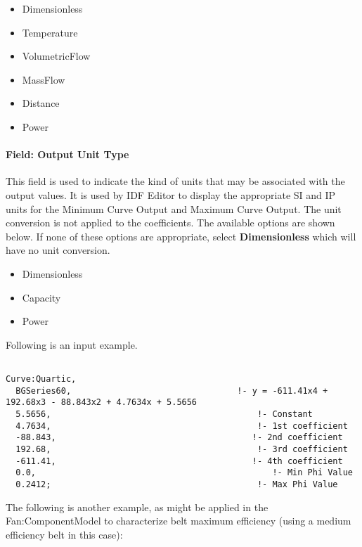 \begin{itemize}
\item
  Dimensionless
\item
  Temperature
\item
  VolumetricFlow
\item
  MassFlow
\item
  Distance
\item
  Power
\end{itemize}

\paragraph{Field: Output Unit Type}\label{field-output-unit-type-3}

This field is used to indicate the kind of units that may be associated with the output values. It is used by IDF Editor to display the appropriate SI and IP units for the Minimum Curve Output and Maximum Curve Output. The unit conversion is not applied to the coefficients. The available options are shown below. If none of these options are appropriate, select \textbf{Dimensionless} which will have no unit conversion.

\begin{itemize}
\item
  Dimensionless
\item
  Capacity
\item
  Power
\end{itemize}

Following is an input example.

\begin{lstlisting}

Curve:Quartic,
  BGSeries60,                                 !- y = -611.41x4 + 192.68x3 - 88.843x2 + 4.7634x + 5.5656
  5.5656,                                         !- Constant
  4.7634,                                         !- 1st coefficient
  -88.843,                                       !- 2nd coefficient
  192.68,                                         !- 3rd coefficient
  -611.41,                                       !- 4th coefficient
  0.0,                                               !- Min Phi Value
  0.2412;                                         !- Max Phi Value
\end{lstlisting}

The following is another example, as might be applied in the Fan:ComponentModel to characterize belt maximum efficiency (using a medium efficiency belt in this case):

